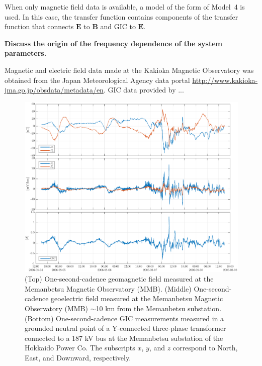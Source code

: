 \documentclass[draft,linenumbers]{agujournal2018}
\begin{document}
When only magnetic field data is available, a model of the form of Model~4 is used. In this case, the transfer function contains components of the transfer function that connects $\mathbf{E}$ to $\mathbf{B}$ and GIC to $\mathbf{E}$. 

 {\color{red}\textbf{Discuss the origin of the frequency dependence of the system parameters.}}

\acknowledgments
Magnetic and electric field data made at the Kakioka Magnetic Observatory was obtained from the Japan Meteorological Agency data portal \url{http://www.kakioka-jma.go.jp/obsdata/metadata/en}.  GIC data provided by ...




\begin{figure}[h]
\centering
\includegraphics[width=\textwidth]{figures/plot_raw_All_20060805.pdf}
\caption{(Top) One-second-cadence geomagnetic field measured at the Memanbetsu Magnetic Observatory (MMB). (Middle) One-second-cadence geoelectric field measured at the Memanbetsu Magnetic Observatory (MMB) $\sim$10 km from the Memanbetsu substation. (Bottom) One-second-cadence GIC measurements measured in a grounded neutral point of a Y-connected three-phase transformer connected to a 187 kV bus at the Memanbetsu substation of the Hokkaido Power Co. The subscripts $x$, $y$, and $z$ correspond to North, East, and Downward, respectively.}
\label{sample}
\end{figure}
\end{document}
